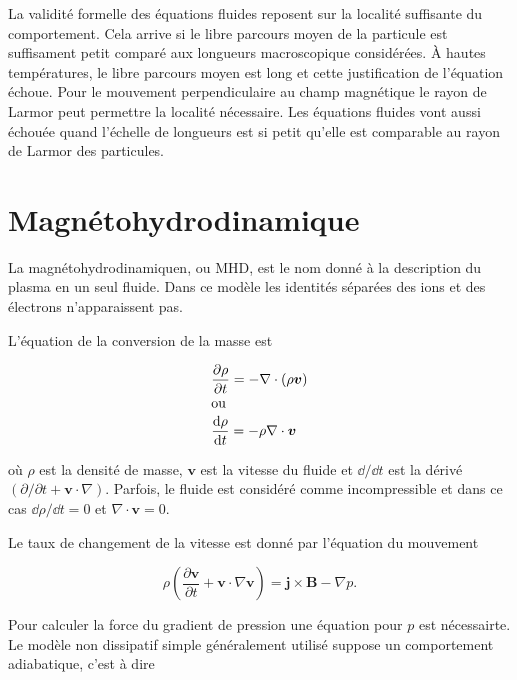 \documentclass[main.tex]{subfiles}
\begin{document}
La validité formelle des équations fluides reposent sur la localité suffisante du comportement.
Cela arrive si le libre parcours moyen de la particule est suffisament petit comparé aux longueurs macroscopique considérées.
À hautes températures, le libre parcours moyen est long et cette justification de l'équation échoue.
Pour le mouvement perpendiculaire au champ magnétique le rayon de Larmor peut permettre la localité nécessaire.
Les équations fluides vont aussi échouée quand  l'échelle de longueurs est si petit qu'elle est comparable au rayon de Larmor des particules.

\section{Magnétohydrodinamique}
\label{sec:mhd}

La magnétohydrodinamiquen, ou MHD, est le nom donné à la description du plasma en un seul fluide.
Dans ce modèle les identités séparées des ions et des électrons n'apparaissent pas.

L'équation de la conversion de la masse est

\begin{subequations}
	\begin{align}
		&\frac{\partial \rho}{\partial t} = - \nabla \cdot \left( \rho \bm{v}\right)
		\label{eq:MHD1a}\\
	\intertext{ou}
		&\frac{\text{d} \rho}{\text{d} t} = - \rho \nabla \cdot \bm{v}
		\label{eq:MHD1b}
	\end{align}
	\label{eq:MHD1}
\end{subequations}

\noindent où \( \rho \) est la densité de masse, \( \bm{v} \) est la vitesse du fluide et \( \dd / \dd t \) est la dérivé \( \left( \partial / \partial t + \bm{v} \cdot \nabla \right) \).
Parfois, le fluide est considéré comme incompressible et dans ce cas \( \dd \rho / \dd t = 0 \) et \( \nabla \cdot \bm{v} = 0 \).

Le taux de changement de la vitesse est donné par l'équation du mouvement

\begin{equation}
	\rho \left( \frac{\partial \bm{v}}{\partial t} + \bm{v} \cdot \nabla \bm{v} \right) = \bm{j} \times \bm{B} - \nabla p.
	\label{eq:mhd_mouvement}
\end{equation}

\noindent Pour calculer la force du gradient de pression une équation pour \( p \) est nécessairte.
Le modèle non dissipatif simple généralement utilisé suppose un comportement adiabatique, c'est à dire
\end{document}
